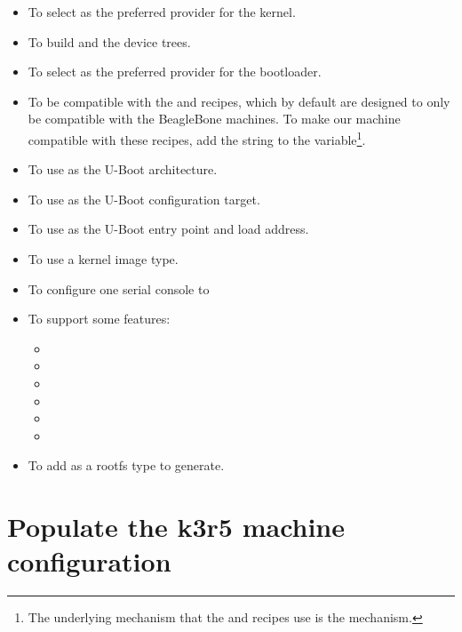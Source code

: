 \if{}
\begin{itemize}
  \item To select  as the preferred provider
    for the kernel.
  \item To build  and the
     device trees.
  \item To select  as the preferred provider
    for the bootloader.
  \item To be compatible with the  and 
    recipes, which by default are designed to only be compatible with the
    BeagleBone machines. To make our  machine compatible with
    these recipes, add the string  to the
     variable\footnote{The underlying mechanism that the
     and  recipes use is the
     mechanism.}.
  \item To use  as the U-Boot architecture.
  \item To use  as the U-Boot
    configuration target.
  \item To use  as the U-Boot entry point and load
    address.
  \item To use a  kernel image type.
  \item To configure one serial console to 
  \item To support some features:
    \begin{itemize}
      \item {}
      \item {}
      \item {}
      \item {}
      \item {}
      \item {}
    \end{itemize}
  \item To add  as a rootfs type to generate.
\end{itemize}
\fi

\if{}
\section{Populate the k3r5 machine configuration}

